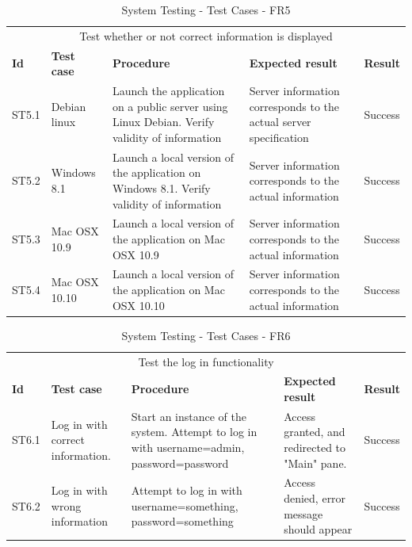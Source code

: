 \begin{table}[ht!]
\begin{tabular}{|m{1cm}|m{2cm}|m{4cm}|m{3cm}|m{1cm}|}
\hline
\rowcolor{lightgray}
\multicolumn{5}{|c|}{\textbf{FR5, Information}} \\ \hline
\multicolumn{5}{|c|}{{Test whether or not correct information is displayed}} \\ \hline
\textbf{Id} & \textbf{Test case} & \textbf{Procedure} & \textbf{Expected result} & \textbf{Result} \\ \hline
ST5.1 & Debian linux & Launch the application on a public server using Linux Debian. Verify validity of information & Server information corresponds to the actual server specification & Success  \\ \hline
ST5.2 & Windows 8.1 & Launch a local version of the application on Windows 8.1. Verify validity of information & Server information corresponds to the actual information & Success \\ \hline
ST5.3 & Mac OSX 10.9 & Launch a local version of the application on Mac OSX 10.9 & Server information corresponds to the actual information & Success \\ \hline
ST5.4 & Mac OSX 10.10 & Launch a local version of the application on Mac OSX 10.10 & Server information corresponds to the actual information & Success \\ \hline

\end{tabular}
\caption{System Testing - Test Cases - FR5}
\label{table:system-testing-cases-fr5}
\end{table}

\begin{table}[ht!]
\begin{tabular}{|m{1cm}|m{2cm}|m{4cm}|m{3cm}|m{1cm}|}
\hline
\rowcolor{lightgray}
\multicolumn{5}{|c|}{\textbf{FR6, Log in}} \\ \hline
\multicolumn{5}{|c|}{{Test the log in functionality}} \\ \hline
\textbf{Id} & \textbf{Test case} & \textbf{Procedure} & \textbf{Expected result} & \textbf{Result} \\ \hline
ST6.1 & Log in with correct information. & Start an instance of the system. Attempt to log in with username=admin, password=password & Access granted, and redirected to "Main" pane. & Success \\ \hline
ST6.2 & Log in with wrong information & Attempt to log in with username=something, password=something & Access denied, error message should appear & Success \\ \hline

\end{tabular}
\caption{System Testing - Test Cases - FR6}
\label{table:system-testing-cases-fr6}
\end{table}


